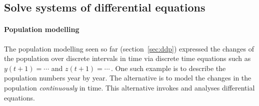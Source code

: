 \subsection{Solve systems of differential equations}
\label{sec:ssde}

\paragraph{Population modelling}
The population modelling seen so far (section~\ref{sec:ddp}) expressed the changes of the population over discrete intervals in time via discrete time equations such as \(y(t+1)=\cdots\) and \(z(t+1)=\cdots\)\,.
One such example is to describe the population numbers year by year.
The alternative is to model the changes in the population \emph{continuously} in time.
This alternative invokes and analyses differential equations.

